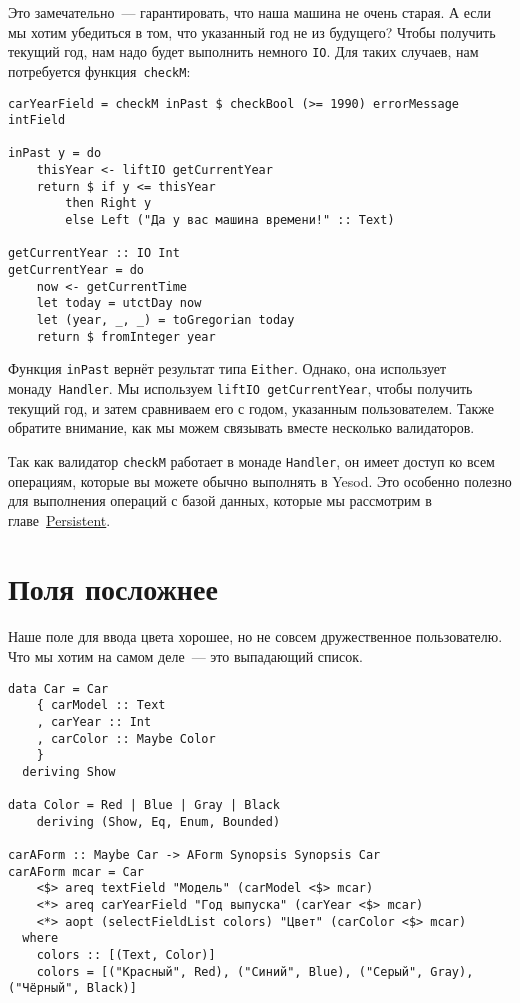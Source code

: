 Это замечательно~--- гарантировать, что наша машина не очень старая. А если мы
хотим убедиться в том, что указанный год не из будущего? Чтобы получить
текущий год, нам надо будет выполнить немного \lstinline'IO'. Для таких
случаев, нам потребуется функция~\lstinline'checkM':

\begin{lstlisting}
carYearField = checkM inPast $ checkBool (>= 1990) errorMessage intField

inPast y = do
    thisYear <- liftIO getCurrentYear
    return $ if y <= thisYear
        then Right y
        else Left ("Да у вас машина времени!" :: Text)

getCurrentYear :: IO Int
getCurrentYear = do
    now <- getCurrentTime
    let today = utctDay now
    let (year, _, _) = toGregorian today
    return $ fromInteger year
\end{lstlisting}%

Функция \lstinline'inPast' вернёт результат типа \lstinline'Either'. Однако,
она использует монаду~\lstinline'Handler'. Мы используем \lstinline'liftIO getCurrentYear',
чтобы получить текущий год, и затем сравниваем его с годом, указанным
пользователем. Также обратите внимание, как мы можем связывать вместе
несколько валидаторов.

\begin{remark}
Так как валидатор \lstinline'checkM' работает в монаде \lstinline'Handler', он
имеет доступ ко всем операциям, которые вы можете обычно выполнять в Yesod.
Это особенно полезно для выполнения операций с базой данных, которые мы
рассмотрим в главе~\hyperref[chap:persistent]{Persistent}.
\end{remark}

\section{Поля посложнее}
Наше поле для ввода цвета хорошее, но не совсем дружественное пользователю.
Что мы хотим на самом деле~--- это выпадающий список.

\begin{lstlisting}[caption={Выпадающие списки}]
data Car = Car
    { carModel :: Text
    , carYear :: Int
    , carColor :: Maybe Color
    }
  deriving Show

data Color = Red | Blue | Gray | Black
    deriving (Show, Eq, Enum, Bounded)

carAForm :: Maybe Car -> AForm Synopsis Synopsis Car
carAForm mcar = Car
    <$> areq textField "Модель" (carModel <$> mcar)
    <*> areq carYearField "Год выпуска" (carYear <$> mcar)
    <*> aopt (selectFieldList colors) "Цвет" (carColor <$> mcar)
  where
    colors :: [(Text, Color)]
    colors = [("Красный", Red), ("Синий", Blue), ("Серый", Gray), ("Чёрный", Black)]
\end{lstlisting}%

